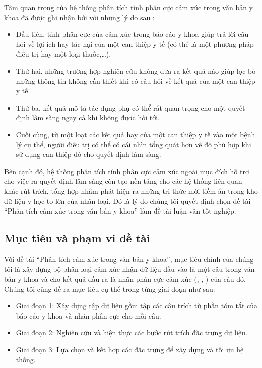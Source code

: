 Tầm quan trọng của hệ thống phân tích tính phân cực cảm xúc trong văn bản y khoa đã được ghi nhận bởi \cite{niu2005analysis} với những lý do sau : 
\begin{itemize}
\item Đầu tiên, tính phân cực của cảm xúc trong báo cáo y khoa giúp trả lời câu hỏi về lợi ích hay tác hại của một can thiệp y tế (có thể là một phương pháp điều trị hay một loại thuốc,\ldots).
\item Thứ hai, những trường hợp nghiên cứu không đưa ra kết quả nào giúp lọc bỏ những thông tin không cần thiết khi có câu hỏi về kết quả của một can thiệp y tế.
\item Thứ ba, kết quả \tieucuc mô tả tác dụng phụ có thể rất quan trọng cho một quyết định lâm sàng ngay cả khi không được hỏi tới.
\item Cuối cùng, từ một loạt các kết quả \tichcuc hay \tieucuc của một can thiệp y tế vào một bệnh lý cụ thể, người điều trị có thể có cái nhìn tổng quát hơn về độ phù hợp khi sử dụng can thiệp đó cho quyết định lâm sàng.
\end{itemize}

Bên cạnh đó, hệ thống phân tích tính phân cực cảm xúc ngoài mục đích hỗ trợ cho việc ra quyết định lâm sàng còn tạo nền tảng cho các hệ thống liên quan khác rút trích, tổng hợp nhằm phát hiện ra những tri thức mới tiềm ẩn trong kho dữ liệu y học to lớn của nhân loại. Đó là lý do chúng tôi quyết định chọn đề tài ``Phân tích cảm xúc trong văn bản y khoa'' làm đề tài luận văn tốt nghiệp.

\subsection{Mục tiêu và phạm vi đề tài}
Với đề tài ``Phân tích cảm xúc trong văn bản y khoa'', mục tiêu chính của chúng tôi là xây dựng bộ phân loại cảm xúc nhận dữ liệu đầu vào là một câu trong văn bản y khoa và cho kết quả đầu ra là nhãn phân cực cảm xúc (\tichcuc, \tieucuc, \trungtinh) của câu đó. Chúng tôi cũng đề ra mục tiêu cụ thể trong từng giai đoạn như sau:

\begin{itemize}
\item Giai đoạn 1: Xây dựng tập dữ liệu gồm tập các câu trích từ phần tóm tắt của báo cáo y khoa và nhãn phân cực cho mỗi câu.
\item Giai đoạn 2: Nghiên cứu và hiện thực các bước rút trích đặc trưng dữ liệu.
\item Giai đoạn 3: Lựa chọn và kết hợp các đặc trưng để xây dựng và tối ưu hệ thống.
\end{itemize}

